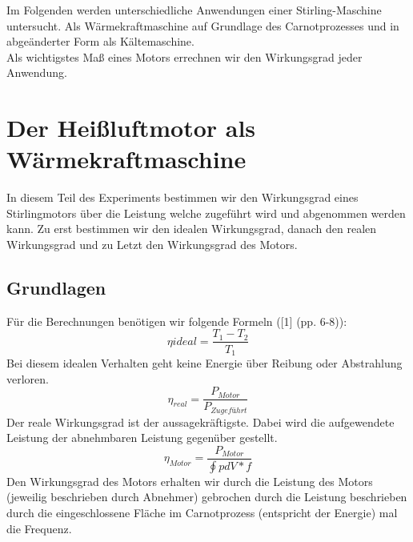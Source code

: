\documentclass[12pt,a4paper]{article}
\begin{document}
\begin{multicols}{2}




%			


\noindent Im Folgenden werden unterschiedliche Anwendungen einer Stirling-Maschine untersucht. Als Wärmekraftmaschine auf Grundlage des Carnotprozesses und in abgeänderter Form als Kältemaschine.\\
Als wichtigstes Maß eines Motors errechnen wir den Wirkungsgrad jeder Anwendung.


\section{Der Heißluftmotor als Wärmekraftmaschine}
In diesem Teil des Experiments bestimmen wir den Wirkungsgrad eines Stirlingmotors über die Leistung welche zugeführt wird und abgenommen werden kann. Zu erst bestimmen wir den idealen Wirkungsgrad, danach den realen Wirkungsgrad und zu Letzt den Wirkungsgrad des Motors.

\subsection{Grundlagen}
Für die Berechnungen benötigen wir folgende Formeln ([1] (pp. 6-8)):\\
$$\eta{ideal} = \frac{T_1 - T_2}{T_1}$$
Bei diesem idealen Verhalten geht keine Energie über Reibung oder Abstrahlung verloren.
$$\eta_{real} = \frac{P_{Motor}}{P_{Zugeführt}}$$
Der reale Wirkungsgrad ist der aussagekräftigste. Dabei wird die aufgewendete Leistung der abnehmbaren Leistung gegenüber gestellt.
$$\eta_{Motor} = \frac{P_{Motor}}{\oint p dV * f}$$
Den Wirkungsgrad des Motors erhalten wir durch die Leistung des Motors (jeweilig beschrieben durch Abnehmer) gebrochen durch die Leistung beschrieben durch die eingeschlossene Fläche im Carnotprozess (entspricht der Energie) mal die Frequenz. 


\end{multicols}
\end{document}
